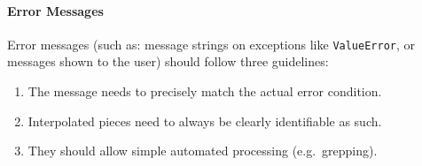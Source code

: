 \documentclass[
]{article}
\newenvironment{Shaded}{}{}
\newcommand{\ControlFlowTok}[1]{\textcolor[rgb]{0.00,0.44,0.13}{\textbf{#1}}}
\newcommand{\ImportTok}[1]{\textcolor[rgb]{0.00,0.50,0.00}{\textbf{#1}}}
\newcommand{\KeywordTok}[1]{\textcolor[rgb]{0.00,0.44,0.13}{\textbf{#1}}}
\newcommand{\NormalTok}[1]{#1}
\newcommand{\OperatorTok}[1]{\textcolor[rgb]{0.40,0.40,0.40}{#1}}
\newcommand{\SpecialCharTok}[1]{\textcolor[rgb]{0.25,0.44,0.63}{#1}}
\newcommand{\SpecialStringTok}[1]{\textcolor[rgb]{0.73,0.40,0.53}{#1}}
\newcommand{\StringTok}[1]{\textcolor[rgb]{0.25,0.44,0.63}{#1}}
\newcommand{\VariableTok}[1]{\textcolor[rgb]{0.10,0.09,0.49}{#1}}
\begin{document}
\begin{samepage}
\begin{Shaded}
\end{Shaded}
\end{samepage}

\paragraph{Error Messages}

Error messages (such as: message strings on exceptions like
\texttt{ValueError}, or messages shown to the user) should follow three
guidelines:

\begin{enumerate}
\def\labelenumi{\arabic{enumi}.}
\item
  The message needs to precisely match the actual error condition.
\item
  Interpolated pieces need to always be clearly identifiable as such.
\item
  They should allow simple automated processing (e.g.~grepping).
\end{enumerate}
\end{document}
